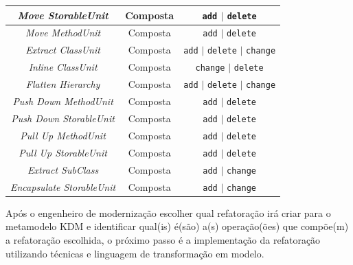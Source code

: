 \begin{table}[h]
\begin{center}
\begin{tabular}{ | m{4.5cm} | m{2.5cm} | m{4cm}| }
\hline
\multicolumn{1}{|c|}{\textit{Move StorableUnit}} &  \multicolumn{1}{c|}{Composta} & \multicolumn{1}{c|}{\texttt{add} $|$ \texttt{delete}}\\ 
\hline
\multicolumn{1}{|c|}{\textit{Move MethodUnit}} &  \multicolumn{1}{c|}{Composta} & \multicolumn{1}{c|}{\texttt{add} $|$ \texttt{delete}}\\ 
\hline
\multicolumn{1}{|c|}{\textit{Extract ClassUnit}} &  \multicolumn{1}{c|}{Composta} & \multicolumn{1}{c|}{\texttt{add} $|$ \texttt{delete} $|$ \texttt{change}}\\
\hline
\multicolumn{1}{|c|}{\textit{Inline ClassUnit}} &  \multicolumn{1}{c|}{Composta} & \multicolumn{1}{c|}{\texttt{change} $|$ \texttt{delete}}\\ 
\hline
\multicolumn{1}{|c|}{\textit{Flatten Hierarchy}} &  \multicolumn{1}{c|}{Composta} & \multicolumn{1}{c|}{\texttt{add} $|$ \texttt{delete} $|$ \texttt{change}}\\ 
\hline
\multicolumn{1}{|c|}{\textit{Push Down MethodUnit}} &  \multicolumn{1}{c|}{Composta} & \multicolumn{1}{c|}{\texttt{add} $|$ \texttt{delete}}\\ 
\hline
\multicolumn{1}{|c|}{\textit{Push Down StorableUnit}} &  \multicolumn{1}{c|}{Composta} & \multicolumn{1}{c|}{\texttt{add} $|$ \texttt{delete}}\\ 
\hline
\multicolumn{1}{|c|}{\textit{Pull Up MethodUnit}} &  \multicolumn{1}{c|}{Composta} & \multicolumn{1}{c|}{\texttt{add} $|$ \texttt{delete}}\\
\hline
\multicolumn{1}{|c|}{\textit{Pull Up StorableUnit}} &  \multicolumn{1}{c|}{Composta} & \multicolumn{1}{c|}{\texttt{add} $|$ \texttt{delete}}\\
\hline
\multicolumn{1}{|c|}{\textit{Extract SubClass}} &  \multicolumn{1}{c|}{Composta} & \multicolumn{1}{c|}{\texttt{add} $|$ \texttt{change}}\\
\hline
\multicolumn{1}{|c|}{\textit{Encapsulate StorableUnit}} &  \multicolumn{1}{c|}{Composta} & \multicolumn{1}{c|}{\texttt{add} $|$ \texttt{change}}\\
\hline
\end{tabular}
\end{center}
\end{table}

Após o engenheiro de modernização escolher qual refatoração irá criar para o metamodelo KDM e identificar qual(is) é(são) a(s) operação(ões) que compõe(m) a refatoração escolhida, o próximo passo é a implementação da refatoração utilizando técnicas e linguagem de transformação em modelo.


